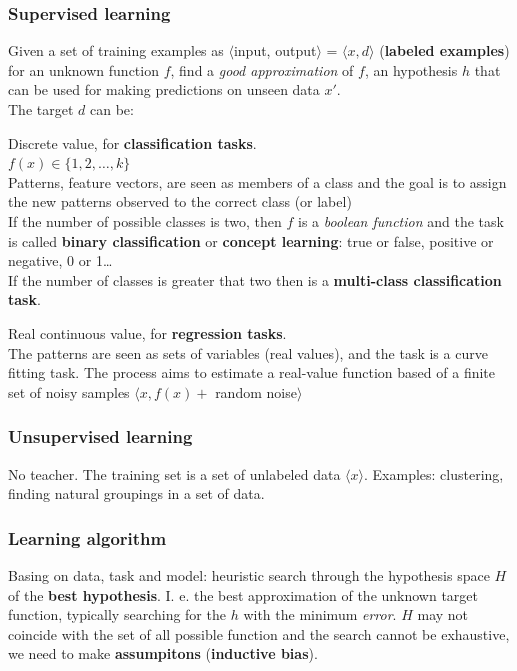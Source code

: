 \documentclass[10pt]{report}
\begin{document}
\subsubsection{Supervised learning} Given a set of training examples as $\langle$input, output$\rangle$ = $\langle x,d\rangle$ (\textbf{labeled examples}) for an unknown function $f$, find a \textit{good approximation} of $f$, an hypothesis $h$ that can be used for making predictions on unseen data $x'$.\\
The target $d$ can be:
\begin{list}{}{}
	\item Discrete value, for \textbf{classification tasks}.\\
	$f(x) \in \{1,2,\ldots,k\}$\\
	Patterns, feature vectors, are seen as members of a class and the goal is to assign the new patterns observed to the correct class (or label)\\
	If the number of possible classes is two, then $f$ is a \textit{boolean function} and the task is called \textbf{binary classification} or \textbf{concept learning}: true or false, positive or negative, 0 or 1\ldots\\
	If the number of classes is greater that two then is a \textbf{multi-class classification task}.
	\item Real continuous value, for \textbf{regression tasks}.\\
	The patterns are seen as sets of variables (real values), and the task is a curve fitting task. The process aims to estimate a real-value function based of a finite set of noisy samples $\langle x, f(x) +$ random noise$\rangle$
\end{list}
\subsubsection{Unsupervised learning} No teacher. The training set is a set of unlabeled data $\langle x\rangle$. Examples: clustering, finding natural groupings in a set of data.
\subsubsection{Learning algorithm} Basing on data, task and model: heuristic search through the hypothesis space $H$ of the \textbf{best hypothesis}. I. e. the best approximation of the unknown target function, typically searching for the $h$ with the minimum \textit{error}. $H$ may not coincide with the set of all possible function and the search cannot be exhaustive, we need to make \textbf{assumpitons} (\textbf{inductive bias}).
\end{document}
